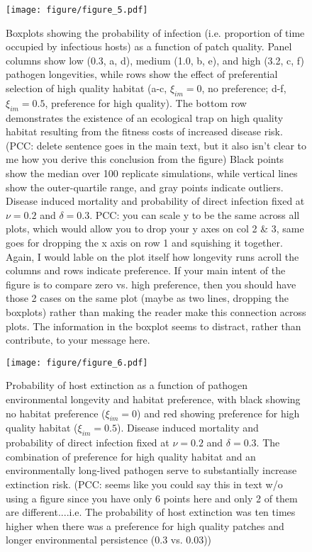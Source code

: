 \documentclass{article}
\begin{document}
\begin{figure}
\texttt{[image: figure/figure\_5.pdf]}
\centering
\caption{Boxplots showing the probability of infection (i.e. proportion of time occupied by infectious hosts) as a function of patch quality.  Panel columns show low (0.3, a, d), medium (1.0, b, e), and high (3.2, c, f) pathogen longevities, while rows show the effect of preferential selection of high quality habitat (a-c, $\xi_{im} = 0$,  no preference; d-f, $\xi_{im} = 0.5$, preference for high quality). The bottom row demonstrates the existence of an ecological trap on high quality habitat resulting from the fitness costs of increased disease risk. (PCC: delete sentence goes in the main text, but it also isn't clear to me how you derive this conclusion from the figure) Black points show the median over 100 replicate simulations, while vertical lines show the outer-quartile range, and gray points indicate outliers. Disease induced mortality and probability of direct infection fixed at $\nu = 0.2$ and $\delta = 0.3$. PCC: you can scale y to be the same across all plots, which would allow you to drop your y axes on col 2 & 3, same goes for dropping the x axis on row 1 and squishing it together. Again, I would lable on the plot itself how longevity runs acroll the columns and rows indicate preference. If your main intent of the figure is to compare zero vs. high preference, then you should have those 2 cases on the same plot (maybe as two lines, dropping the boxplots) rather than making the reader make this connection across plots. The information in the boxplot seems to distract, rather than contribute, to your message here. }
\label{pinfection}
\end{figure}

\begin{figure}
\texttt{[image: figure/figure\_6.pdf]}
\centering
\caption{Probability of host extinction as a function of pathogen environmental longevity and habitat preference, with black showing no habitat preference ($\xi_{im} = 0$) and red showing preference for high quality habitat ($\xi_{im} = 0.5$).  Disease induced mortality and probability of direct infection fixed at $\nu = 0.2$ and $\delta = 0.3$.  The combination of preference for high quality habitat and an environmentally long-lived pathogen serve to substantially increase extinction risk.  (PCC: seems like you could say this in text w/o using a figure since you have only 6 points here and only 2 of them are different....i.e. The probability of host extinction was ten times higher when there was a preference for high quality patches and longer environmental persistence (0.3 vs. 0.03))}
\label{pext}
\end{figure}
\clearpage
\end{document}
